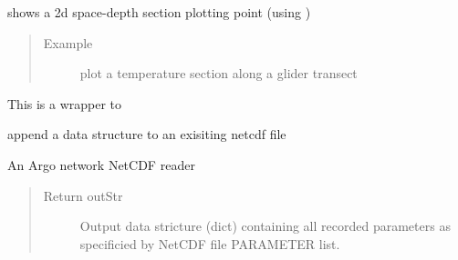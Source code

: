 \documentclass[letterpaper,10pt,english]{sphinxmanual}
\begin{document}
\begin{fulllineitems}
\begin{fulllineitems}
\end{fulllineitems}


\begin{fulllineitems}
\label{altimetry.data:altimetry.data.hydro_data.plot_transect}
shows a 2d space-depth section plotting point (using )
\begin{quote}\begin{description}
\item[{Example }] \leavevmode
plot a temperature section along a glider transect

\end{description}\end{quote}

\end{fulllineitems}


\begin{fulllineitems}
\label{altimetry.data:altimetry.data.hydro_data.pop}
This is a wrapper to {\hyperref[altimetry.data:altimetry.data.hydro_data.delete_Variable]{}}

\end{fulllineitems}


\begin{fulllineitems}
\label{altimetry.data:altimetry.data.hydro_data.push_nc}
append a data structure to an exisiting netcdf file

\end{fulllineitems}


\begin{fulllineitems}
\label{altimetry.data:altimetry.data.hydro_data.read_ArgoNC}
An Argo network NetCDF reader
\begin{quote}\begin{description}
\item[{Return outStr}] \leavevmode
Output data stricture (dict) containing all recorded parameters as specificied by NetCDF file PARAMETER list.


\end{description}
\end{quote}
\end{fulllineitems}
\end{fulllineitems}
\end{document}
